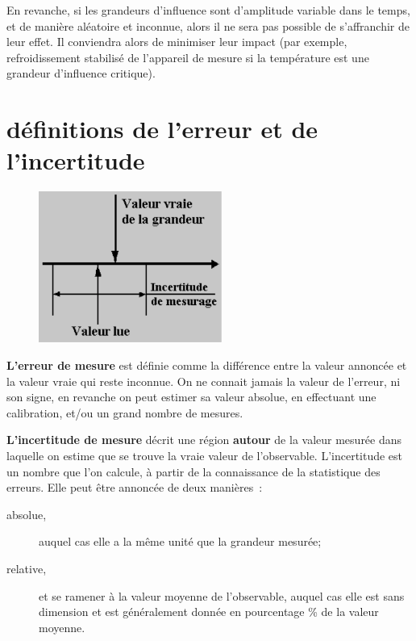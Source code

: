 En revanche, si les grandeurs d'influence sont d'amplitude variable dans le temps, et de manière aléatoire et inconnue, alors il ne sera pas possible de s'affranchir de leur effet. Il conviendra alors de minimiser leur impact (par exemple, refroidissement stabilisé de l'appareil de mesure si la température est une grandeur d'influence critique).

\section{définitions de l'erreur et de l'incertitude}

\begin{figure}
   \centering
   \vspace{-5.5mm}
   \includegraphics[width=6cm]{assets/figures/errinc.pdf}
\end{figure}

\textbf{L'erreur de mesure} est définie comme la différence entre la valeur annoncée et la valeur vraie qui reste inconnue. On ne connait jamais la valeur de l'erreur, ni son signe, en revanche on peut estimer sa valeur absolue, en effectuant une calibration, et/ou un grand nombre de mesures.

\textbf{L'incertitude de mesure} décrit une région \textbf{autour} de la valeur mesurée dans laquelle on estime que se trouve la vraie valeur de l'observable. L'incertitude est un nombre que l'on calcule, à partir de la connaissance de la statistique des erreurs. Elle peut être annoncée de deux manières~:
\begin{description}
\item[absolue,] auquel cas elle a la même unité que la grandeur mesurée;
\item[relative,] et se ramener à la valeur moyenne de l'observable, auquel cas elle est sans dimension et est généralement donnée en pourcentage \% de la valeur moyenne.
\end{description}

\begin{center}
\end{center}

